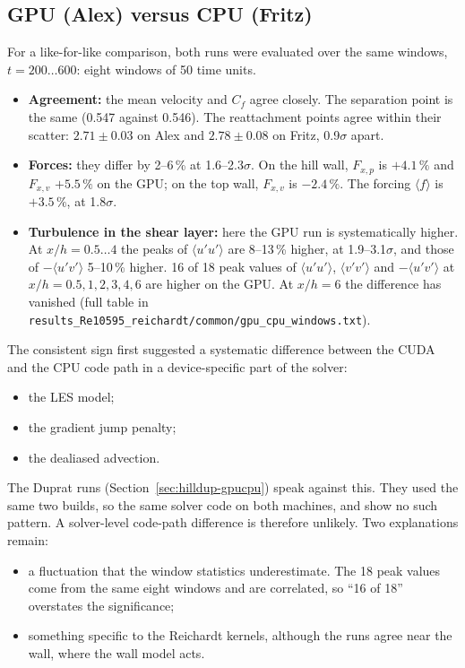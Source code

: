 \documentclass[11pt,a4paper]{article}
\newcommand{\code}[1]{\texttt{#1}}
\begin{document}
\subsection{GPU (Alex) versus CPU (Fritz)}
\label{sec:gpucpu}

For a like-for-like comparison, both runs were evaluated over the same
windows, $t = 200\ldots600$: eight windows of 50 time units.

\begin{itemize}
  \item \textbf{Agreement:} the mean velocity and $C_f$ agree closely. The
    separation point is the same (0.547 against 0.546). The reattachment
    points agree within their scatter: $2.71 \pm 0.03$ on Alex and
    $2.78 \pm 0.08$ on Fritz, 0.9$\sigma$ apart.
  \item \textbf{Forces:} they differ by 2--6\,\% at 1.6--2.3$\sigma$.
    On the hill wall, $F_{x,p}$ is $+4.1\,\%$ and $F_{x,v}$ $+5.5\,\%$ on
    the GPU; on the top wall, $F_{x,v}$ is $-2.4\,\%$. The forcing
    $\langle f\rangle$ is $+3.5\,\%$, at 1.8$\sigma$.
  \item \textbf{Turbulence in the shear layer:} here the GPU run is
    systematically higher. At $x/h = 0.5\ldots4$ the peaks of
    $\langle u'u'\rangle$ are 8--13\,\% higher, at 1.9--3.1$\sigma$, and
    those of $-\langle u'v'\rangle$ 5--10\,\% higher. 16 of 18 peak values
    of $\langle u'u'\rangle$, $\langle v'v'\rangle$ and
    $-\langle u'v'\rangle$ at $x/h = 0.5, 1, 2, 3, 4, 6$ are higher on the
    GPU. At $x/h = 6$ the difference has vanished (full table in
    \code{results\_Re10595\_reichardt/common/gpu\_cpu\_windows.txt}).
\end{itemize}

The consistent sign first suggested a systematic difference between the CUDA
and the CPU code path in a device-specific part of the solver:
\begin{itemize}
  \item the LES model;
  \item the gradient jump penalty;
  \item the dealiased advection.
\end{itemize}

The Duprat runs (Section~\ref{sec:hilldup-gpucpu}) speak against this. They
used the same two builds, so the same solver code on both machines, and show
no such pattern. A solver-level code-path difference is therefore unlikely.
Two explanations remain:
\begin{itemize}
  \item a fluctuation that the window statistics underestimate. The 18 peak
    values come from the same eight windows and are correlated, so
    ``16 of 18'' overstates the significance;
  \item something specific to the Reichardt kernels, although the runs agree
    near the wall, where the wall model acts.
\end{itemize}
\end{document}
